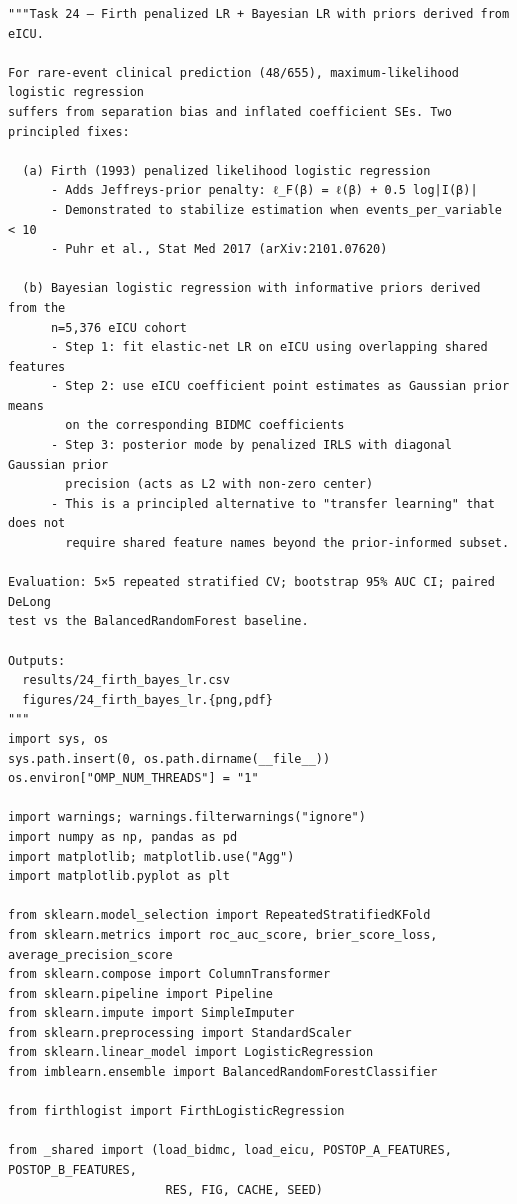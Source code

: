 \documentclass[11pt,a4paper]{article}
\begin{document}
\begin{lstlisting}[style=codeblock]
"""Task 24 — Firth penalized LR + Bayesian LR with priors derived from eICU.

For rare-event clinical prediction (48/655), maximum-likelihood logistic regression
suffers from separation bias and inflated coefficient SEs. Two principled fixes:

  (a) Firth (1993) penalized likelihood logistic regression
      - Adds Jeffreys-prior penalty: ℓ_F(β) = ℓ(β) + 0.5 log|I(β)|
      - Demonstrated to stabilize estimation when events_per_variable < 10
      - Puhr et al., Stat Med 2017 (arXiv:2101.07620)

  (b) Bayesian logistic regression with informative priors derived from the
      n=5,376 eICU cohort
      - Step 1: fit elastic-net LR on eICU using overlapping shared features
      - Step 2: use eICU coefficient point estimates as Gaussian prior means
        on the corresponding BIDMC coefficients
      - Step 3: posterior mode by penalized IRLS with diagonal Gaussian prior
        precision (acts as L2 with non-zero center)
      - This is a principled alternative to "transfer learning" that does not
        require shared feature names beyond the prior-informed subset.

Evaluation: 5×5 repeated stratified CV; bootstrap 95% AUC CI; paired DeLong
test vs the BalancedRandomForest baseline.

Outputs:
  results/24_firth_bayes_lr.csv
  figures/24_firth_bayes_lr.{png,pdf}
"""
import sys, os
sys.path.insert(0, os.path.dirname(__file__))
os.environ["OMP_NUM_THREADS"] = "1"

import warnings; warnings.filterwarnings("ignore")
import numpy as np, pandas as pd
import matplotlib; matplotlib.use("Agg")
import matplotlib.pyplot as plt

from sklearn.model_selection import RepeatedStratifiedKFold
from sklearn.metrics import roc_auc_score, brier_score_loss, average_precision_score
from sklearn.compose import ColumnTransformer
from sklearn.pipeline import Pipeline
from sklearn.impute import SimpleImputer
from sklearn.preprocessing import StandardScaler
from sklearn.linear_model import LogisticRegression
from imblearn.ensemble import BalancedRandomForestClassifier

from firthlogist import FirthLogisticRegression

from _shared import (load_bidmc, load_eicu, POSTOP_A_FEATURES, POSTOP_B_FEATURES,
                      RES, FIG, CACHE, SEED)


\end{lstlisting}
\end{document}
